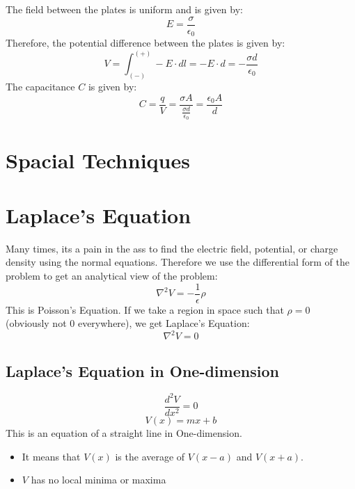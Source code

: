 \documentclass{article}
\begin{document}
\begin{center}
\end{center}
The field between the plates is uniform and is given by:
\[ E = \frac{\sigma}{\epsilon_0} \]
Therefore, the potential difference between the plates is given by:
\[ V = \int_{(-)}^{(+)} -E\cdot dl = -E\cdot d = -\frac{\sigma d}{\epsilon_0} \]
The capacitance $C$ is given by:
\[ C = \frac{q}{V} = \frac{\sigma A}{\frac{\sigma d}{\epsilon_0}} = \frac{\epsilon_0 A}{d} \]

\section*{Spacial Techniques}
\section{Laplace's Equation}
Many times, its a pain in the ass to find the electric field, potential, or charge density using the normal equations.
Therefore we use the differential form of the problem to get an analytical view of the problem:
\[ \nabla^2 V = - \frac{1}{\epsilon}\rho\]
This is Poisson's Equation.
If we take a region in space such that \( \rho = 0 \) (obviously not \(0\) everywhere), we get Laplace's Equation:
\[ \nabla^2 V = 0\]

\subsection{Laplace's Equation in One-dimension}
\[ \frac{d^2 V}{dx^2} = 0\]
\[ V(x) = mx + b \]
This is an equation of a straight line in One-dimension.
\begin{itemize}
\item It means that \(V(x)\) is the average of \(V(x-a)\) and \(V(x+a)\).
\item \(V\) has no local minima or maxima
\end{itemize}
\end{document}

